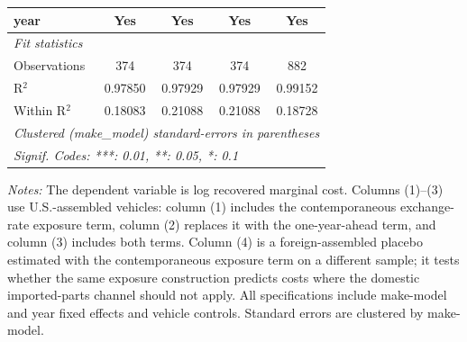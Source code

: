 \begin{table}[htbp]
\begin{tabular}{lcccc}
      year                                     & Yes            & Yes            & Yes            & Yes\\
      \midrule
      \emph{Fit statistics}\\
      Observations                             & 374            & 374            & 374            & 882\\
      R$^2$                                    & 0.97850        & 0.97929        & 0.97929        & 0.99152\\
      Within R$^2$                             & 0.18083        & 0.21088        & 0.21088        & 0.18728\\
      \midrule \midrule
      \multicolumn{5}{l}{\emph{Clustered (make\_model) standard-errors in parentheses}}\\
      \multicolumn{5}{l}{\emph{Signif. Codes: ***: 0.01, **: 0.05, *: 0.1}}\\
   \end{tabular}
\vspace{0.25em}
\begin{minipage}{0.96\textwidth}
\footnotesize \textit{Notes:} The dependent variable is log recovered marginal cost. Columns (1)--(3) use U.S.-assembled vehicles: column (1) includes the contemporaneous exchange-rate exposure term, column (2) replaces it with the one-year-ahead term, and column (3) includes both terms. Column (4) is a foreign-assembled placebo estimated with the contemporaneous exposure term on a different sample; it tests whether the same exposure construction predicts costs where the domestic imported-parts channel should not apply. All specifications include make-model and year fixed effects and vehicle controls. Standard errors are clustered by make-model.
\end{minipage}
\end{table}
